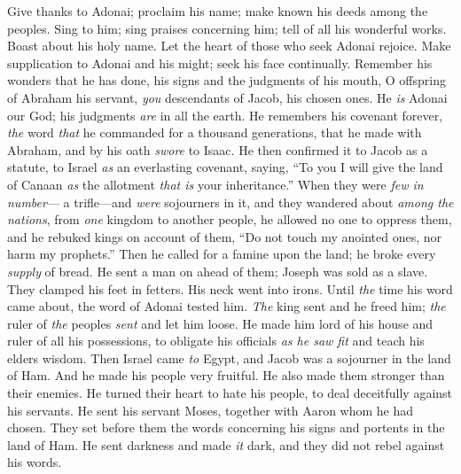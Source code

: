 \begin{biblechapter} %
 Give thanks to Adonai; proclaim his name; 
make known his deeds among the peoples.
\verse Sing to him; sing praises concerning him; 
tell of all his wonderful works.
\verse Boast about his holy name. 
Let the heart of those who seek Adonai rejoice.
\verse Make supplication to Adonai and his might; 
seek his face continually.
\verse Remember his wonders that he has done, 
his signs and the judgments of his mouth,
\verse O offspring of Abraham his servant, 
\textit{you} descendants of Jacob, his chosen ones.
\verse He \textit{is} Adonai our God; 
his judgments \textit{are} in all the earth.
\verse He remembers his covenant forever, 
\textit{the} word \textit{that} he commanded 
for a thousand generations,
\verse that he made with Abraham, 
and by his oath \textit{swore} to Isaac.
\verse He then confirmed it to Jacob as a statute, 
to Israel \textit{as} an everlasting covenant,
\verse saying, “To you I will give the land of Canaan 
\textit{as} the allotment \textit{that is} your inheritance.”
\verse When they were \textit{few in number}— 
a trifle—and \textit{were} sojourners in it,
\verse and they wandered about \textit{among the nations}, 
from \textit{one} kingdom to another people,
\verse he allowed no one to oppress them, 
and he rebuked kings on account of them,
\verse “Do not touch my anointed ones, 
nor harm my prophets.”
\verse Then he called for a famine upon the land; 
he broke every \textit{supply} of bread.
\verse He sent a man on ahead of them; 
Joseph was sold as a slave.
\verse They clamped his feet in fetters. 
His neck went into irons.
\verse Until \textit{the} time his word came about, 
the word of Adonai tested him.
\verse \textit{The} king sent and he freed him; 
\textit{the} ruler of \textit{the} peoples \textit{sent} and let him loose.
\verse He made him lord of his house 
and ruler of all his possessions,
\verse to obligate his officials \textit{as he saw fit} 
and teach his elders wisdom.
\verse Then Israel came \textit{to} Egypt, 
and Jacob was a sojourner in the land of Ham.
\verse And he made his people very fruitful. 
He also made them stronger than their enemies.
\verse He turned their heart to hate his people, 
to deal deceitfully against his servants.
\verse He sent his servant Moses, 
together with Aaron whom he had chosen.
\verse They set before them the words concerning his signs 
and portents in the land of Ham.
\verse He sent darkness and made \textit{it} dark, 
and they did not rebel against his words.

\end{biblechapter}
